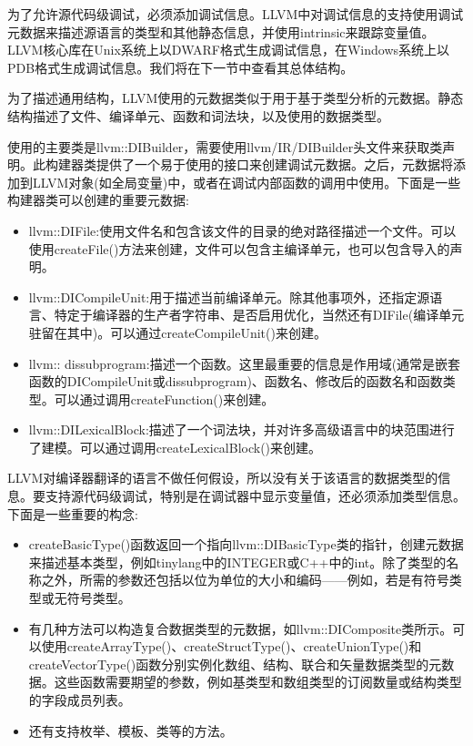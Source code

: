 
为了允许源代码级调试，必须添加调试信息。LLVM中对调试信息的支持使用调试元数据来描述源语言的类型和其他静态信息，并使用intrinsic来跟踪变量值。LLVM核心库在Unix系统上以DWARF格式生成调试信息，在Windows系统上以PDB格式生成调试信息。我们将在下一节中查看其总体结构。


为了描述通用结构，LLVM使用的元数据类似于用于基于类型分析的元数据。静态结构描述了文件、编译单元、函数和词法块，以及使用的数据类型。

使用的主要类是llvm::DIBuilder，需要使用llvm/IR/DIBuilder头文件来获取类声明。此构建器类提供了一个易于使用的接口来创建调试元数据。之后，元数据将添加到LLVM对象(如全局变量)中，或者在调试内部函数的调用中使用。下面是一些构建器类可以创建的重要元数据:

\begin{itemize}
\item
llvm::DIFile:使用文件名和包含该文件的目录的绝对路径描述一个文件。可以使用createFile()方法来创建，文件可以包含主编译单元，也可以包含导入的声明。

\item
llvm::DICompileUnit:用于描述当前编译单元。除其他事项外，还指定源语言、特定于编译器的生产者字符串、是否启用优化，当然还有DIFile(编译单元驻留在其中)。可以通过createCompileUnit()来创建。

\item
llvm:: dissubprogram:描述一个函数。这里最重要的信息是作用域(通常是嵌套函数的DICompileUnit或dissubprogram)、函数名、修改后的函数名和函数类型。可以通过调用createFunction()来创建。

\item
llvm::DILexicalBlock:描述了一个词法块，并对许多高级语言中的块范围进行了建模。可以通过调用createLexicalBlock()来创建。
\end{itemize}

LLVM对编译器翻译的语言不做任何假设，所以没有关于该语言的数据类型的信息。要支持源代码级调试，特别是在调试器中显示变量值，还必须添加类型信息。下面是一些重要的构念:

\begin{itemize}
\item
createBasicType()函数返回一个指向llvm::DIBasicType类的指针，创建元数据来描述基本类型，例如tinylang中的INTEGER或C++中的int。除了类型的名称之外，所需的参数还包括以位为单位的大小和编码——例如，若是有符号类型或无符号类型。

\item
有几种方法可以构造复合数据类型的元数据，如llvm::DIComposite类所示。可以使用createArrayType()、createStructType()、createUnionType()和createVectorType()函数分别实例化数组、结构、联合和矢量数据类型的元数据。这些函数需要期望的参数，例如基类型和数组类型的订阅数量或结构类型的字段成员列表。

\item
还有支持枚举、模板、类等的方法。
\end{itemize}


